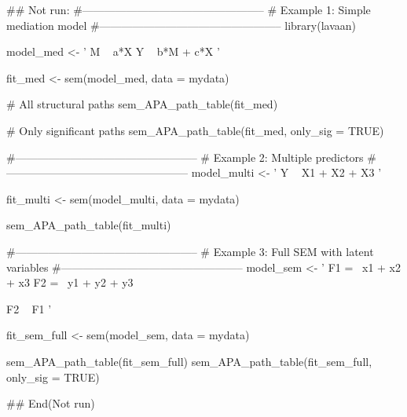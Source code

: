 \documentclass[a4paper]{book}
\begin{document}
\begin{Examples}
\begin{ExampleCode}
\#\# Not run: 
#--------------------------------------------------
# Example 1: Simple mediation model
#--------------------------------------------------
library(lavaan)

model_med <- '
  M ~ a*X
  Y ~ b*M + c*X
'

fit_med <- sem(model_med, data = mydata)

# All structural paths
sem_APA_path_table(fit_med)

# Only significant paths
sem_APA_path_table(fit_med, only_sig = TRUE)

#--------------------------------------------------
# Example 2: Multiple predictors
#--------------------------------------------------
model_multi <- '
  Y ~ X1 + X2 + X3
'

fit_multi <- sem(model_multi, data = mydata)

sem_APA_path_table(fit_multi)

#--------------------------------------------------
# Example 3: Full SEM with latent variables
#--------------------------------------------------
model_sem <- '
  F1 =~ x1 + x2 + x3
  F2 =~ y1 + y2 + y3

  F2 ~ F1
'

fit_sem_full <- sem(model_sem, data = mydata)

sem_APA_path_table(fit_sem_full)
sem_APA_path_table(fit_sem_full, only_sig = TRUE)

## End(Not run)
\end{ExampleCode}
\end{Examples}
\end{document}
